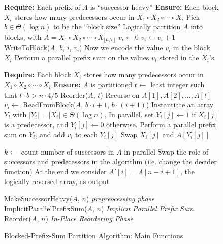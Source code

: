 \documentclass[twoside,leqno,twocolumn]{article}
\begin{document}
\begin{figure*}
  \caption{Blocked-Prefix-Sum Partition Algorithm: Main Functions}
	\label{alg:parallelPartition_prefixsumbased_main}
  \begin{algorithmic} %
    \State \textbf{Require: } Each prefix of $A$ is ``successor heavy''
    \State \textbf{Ensure: }  Each block $X_i$ stores how many predecessors occur in $X_1 \circ X_2 \circ \cdots \circ X_i$
      \State Pick $b \in \Theta(\log n)$ to be the ``block size''
      \State Logically partition $A$ into blocks, with $A = X_1 \circ X_2 \circ \cdots \circ X_{\lfloor n/b \rfloor}$
        \State $v_i \gets 0$  
            \State $v_i \gets v_i + 1$
          \EndIf
        \EndFor
        \State WriteToBlock($A$, $b$, $i$, $v_i$)
        \Comment Now we encode the value $v_i$ in the block $X_i$
      \EndFor
      \State Perform a parallel prefix sum on the values $v_i$ stored in the $X_i$'s
   \EndProcedure
    \State

  \State \textbf{Require: } Each block $X_i$ stores how many predecessors occur in $X_1 \circ X_2 \circ \cdots \circ X_i$
  \State \textbf{Ensure: }  $A$ is partitioned
      \State $t \gets $ least integer such that $t\cdot b > n\cdot 4/5$
      \State Reorder($A$, $t$)
      \Comment Recurse on $A[1], A[2], \ldots, A[t]$
      \State $v_i \gets$ ReadFromBlock($A$, $b\cdot i+1$, $b\cdot(i+1)$) 
        \State Instantiate an array $Y_i$ with $|Y_i| = |X_i| \in \Theta(\log n)$, 
        \State In parallel, set $Y_i[j] \gets 1$ if $X_i[j]$ is a predecessor, and $Y_i[j] \gets 0$ otherwise.
        \State Perform a parallel prefix sum on $Y_i$, and add $v_i$ to each $Y_i[j]$
            \State Swap $X_i[j]$ and $A[Y_i[j]]$
          \EndIf
        \EndFor
      \EndFor
    \EndProcedure
    \State

      \State $k \gets$ count number of successors in $A$ in parallel
        \State Swap the role of successors and predecessors in the algorithm (i.e. change the decider function)
        \State At the end we consider $A'[i] = A[n-i+1]$, the logically reversed array, as output
      \EndIf

      \State MakeSuccessorHeavy($A$, $n$) \Comment \emph{prepreocessing phase}
      \State ImplicitParallelPrefixSum($A$, $n$) \Comment \emph{Implicit Parallel Prefix Sum}
      \State Reorder($A$, $n$) \Comment \emph{In-Place Reordering Phase}
    \EndProcedure
	\end{algorithmic}	
\end{figure*}

\clearpage
\clearpage



\end{document}
